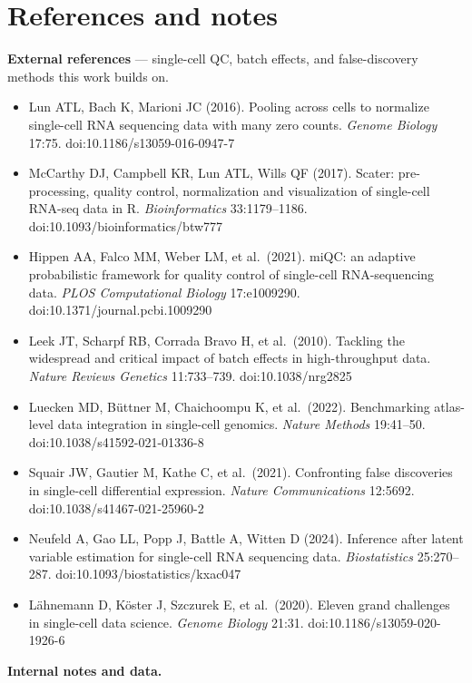 \documentclass[
  11pt,
]{article}
\providecommand{\tightlist}{%
  \setlength{\itemsep}{0pt}\setlength{\parskip}{0pt}}
\begin{document}
\section{References and notes}\label{references-and-notes}

\textbf{External references} --- single-cell QC, batch effects, and
false-discovery methods this work builds on.

\begin{itemize}
\tightlist
\item
  Lun ATL, Bach K, Marioni JC (2016). Pooling across cells to normalize
  single-cell RNA sequencing data with many zero counts. \emph{Genome
  Biology} 17:75. doi:10.1186/s13059-016-0947-7
\item
  McCarthy DJ, Campbell KR, Lun ATL, Wills QF (2017). Scater:
  pre-processing, quality control, normalization and visualization of
  single-cell RNA-seq data in R. \emph{Bioinformatics} 33:1179--1186.
  doi:10.1093/bioinformatics/btw777
\item
  Hippen AA, Falco MM, Weber LM, et al.~(2021). miQC: an adaptive
  probabilistic framework for quality control of single-cell
  RNA-sequencing data. \emph{PLOS Computational Biology} 17:e1009290.
  doi:10.1371/journal.pcbi.1009290
\item
  Leek JT, Scharpf RB, Corrada Bravo H, et al.~(2010). Tackling the
  widespread and critical impact of batch effects in high-throughput
  data. \emph{Nature Reviews Genetics} 11:733--739. doi:10.1038/nrg2825
\item
  Luecken MD, Büttner M, Chaichoompu K, et al.~(2022). Benchmarking
  atlas-level data integration in single-cell genomics. \emph{Nature
  Methods} 19:41--50. doi:10.1038/s41592-021-01336-8
\item
  Squair JW, Gautier M, Kathe C, et al.~(2021). Confronting false
  discoveries in single-cell differential expression. \emph{Nature
  Communications} 12:5692. doi:10.1038/s41467-021-25960-2
\item
  Neufeld A, Gao LL, Popp J, Battle A, Witten D (2024). Inference after
  latent variable estimation for single-cell RNA sequencing data.
  \emph{Biostatistics} 25:270--287. doi:10.1093/biostatistics/kxac047
\item
  Lähnemann D, Köster J, Szczurek E, et al.~(2020). Eleven grand
  challenges in single-cell data science. \emph{Genome Biology} 21:31.
  doi:10.1186/s13059-020-1926-6
\end{itemize}

\textbf{Internal notes and data.}
\end{document}
